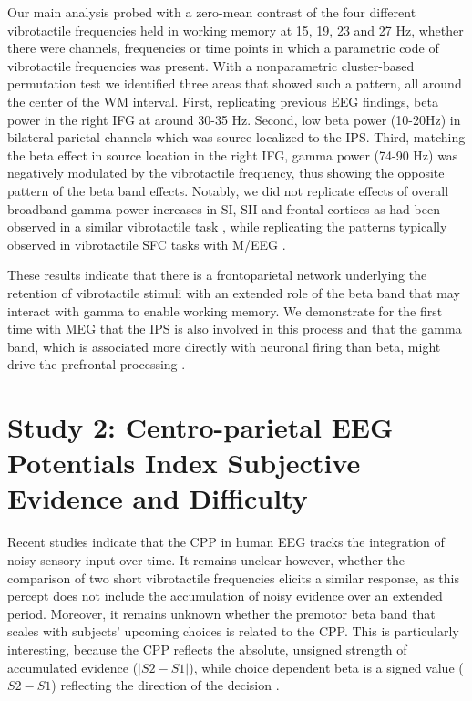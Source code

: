 Our main analysis probed with a zero-mean contrast of the four different vibrotactile frequencies held in working memory at 15, 19, 23 and 27 Hz, whether there were channels, frequencies or time points in which a parametric code of vibrotactile frequencies was present. With a nonparametric cluster-based permutation test we identified three areas that showed such a pattern, all around the center of the WM interval. First, replicating previous EEG findings, beta power in the right IFG at around 30-35 Hz. Second, low beta power (10-20Hz) in bilateral parietal channels which was source localized to the IPS. Third, matching the beta effect in source location in the right IFG, gamma power (74-90 Hz) was negatively modulated by the vibrotactile frequency, thus showing the opposite pattern of the beta band effects. Notably, we did not replicate effects of overall broadband gamma power increases in SI, SII and frontal cortices as had been observed in a similar vibrotactile task \parencite{Haegens2010}, while replicating the patterns typically observed in vibrotactile SFC tasks with M/EEG \parencite{Bauer2006,Spitzer2010}. 

These results indicate that there is a frontoparietal network underlying the retention of vibrotactile stimuli with an extended role of the beta band that may interact with gamma to enable working memory. We demonstrate for the first time with MEG that the IPS is also involved in this process and that the gamma band, which is associated more directly with neuronal firing than beta, might drive the prefrontal processing \parencite{Lundqvist2016,Whittingstall2009}. 

\section{Study 2: Centro-parietal EEG Potentials Index Subjective Evidence and Difficulty}

Recent studies indicate that the CPP in human EEG  tracks the integration of noisy sensory input over time. It remains unclear however, whether the comparison of two short vibrotactile frequencies elicits a similar response, as this percept does not include the accumulation of noisy evidence over an extended period. Moreover, it remains unknown whether the premotor beta band that scales with subjects’ upcoming choices is related to the CPP. This is particularly interesting, because the CPP reflects the absolute, unsigned strength of accumulated evidence ($|S2-S1|$), while choice dependent beta is a signed value ($S2-S1$) reflecting the direction of the decision \parencite[e.g., ][]{Siegel2011,Urai2014}. 

